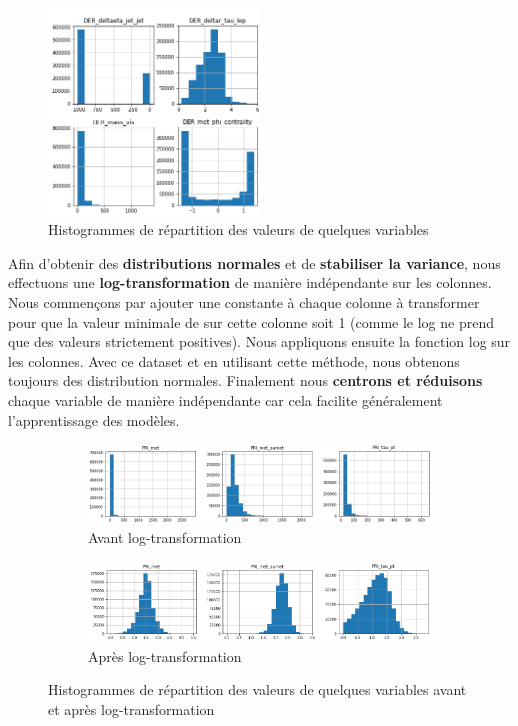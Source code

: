 \documentclass[12pt]{article}
\begin{document}
\begin{figure}[H]
    \center
    \includegraphics[width=0.5\textwidth]{images/histograms_sample.png}
    \caption{Histogrammes de répartition des valeurs de quelques variables}
    \label{img:hist-sample}
\end{figure}

Afin d’obtenir des \textbf{distributions normales} et de \textbf{stabiliser la
variance}, nous effectuons une \textbf{log-transformation} de manière
indépendante sur les colonnes. Nous commençons par ajouter une constante à
chaque colonne à transformer pour que la valeur minimale de sur cette colonne
soit 1 (comme le log ne prend que des valeurs strictement positives). Nous
appliquons ensuite la fonction log sur les colonnes. Avec ce dataset et en
utilisant cette méthode, nous obtenons toujours des distribution normales.
Finalement nous \textbf{centrons et réduisons} chaque variable de manière
indépendante car cela facilite généralement l’apprentissage des modèles. \\

\begin{figure}[H]
	\centering
    \begin{subfigure}[c]{\textwidth}
        \includegraphics[width=\textwidth]{images/histograms_before_log.png}
    \caption{Avant log-transformation}
    \end{subfigure}

    \begin{subfigure}[c]{\textwidth}
        \includegraphics[width=\textwidth]{images/histograms_after_log.png}
    \caption{Après log-transformation}
    \end{subfigure}

    \caption{Histogrammes de répartition des valeurs de quelques variables avant
    et après log-transformation}
    \label{fig:hist-log}
\end{figure}
\end{document}

